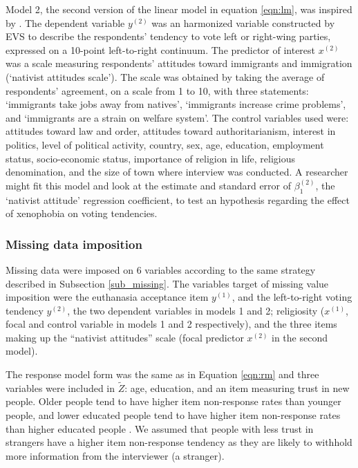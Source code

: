 	Model 2, the second version of the linear model in equation \ref{eqn:lm}, was inspired by \cite{immerzeel:2015}.
	The dependent variable $y^{(2)}$ was an harmonized variable constructed by EVS to describe the respondents' 
	tendency to vote left or right-wing parties, expressed on a 10-point left-to-right continuum.
	The predictor of interest $x^{(2)}$ was a scale measuring respondents' attitudes toward immigrants and immigration 
	(`nativist attitudes scale').
	The scale was obtained by taking the average of respondents' agreement, on a scale from 1 to 10, with three 
	statements: `immigrants take jobs away from natives', `immigrants increase crime problems', and 
	`immigrants are a strain on welfare system'.
	The control variables used were: 
	attitudes toward law and order, attitudes toward authoritarianism, interest in politics, level of political activity,  
	country, sex, age, education, employment status, socio-economic status, importance of religion in life, 
	religious denomination, and the size of town where interview was conducted.
	A researcher might fit this model and look at the estimate and standard error of $\beta^{(2)}_{1}$, 
	the `nativist attitude' regression coefficient, to test an hypothesis regarding the effect of xenophobia on voting 
	tendencies.

\subsubsection{Missing data imposition}

	Missing data were imposed on 6 variables according to the same strategy described in Subsection \ref{sub_missing}.
	The variables target of missing value imposition were the euthanasia acceptance item $y^{(1)}$, and the 
	left-to-right voting tendency $y^{(2)}$, the two dependent variables in models 1 and 2; 
	religiosity ($x^{(1)}$, focal and control variable in models 1 and 2 respectively), 
	and the three items making up the ``nativist attitudes'' scale (focal predictor $x^{(2)}$
	in the second model).

	The response model form was the same as in Equation \eqref{eqn:rm} and three variables were included in $\tilde{Z}$: 
	age, education, and an item measuring trust in new people. 
	Older people tend to have higher item non-response rates than younger people, and 
	lower educated people tend to have higher item non-response rates than higher educated people 
	\citep{guadagnoliCleary:1992, leeuwEtAl:2003}.
	We assumed that people with less trust in strangers have a higher item non-response tendency as 
	they are likely to withhold more information from the interviewer (a stranger).

